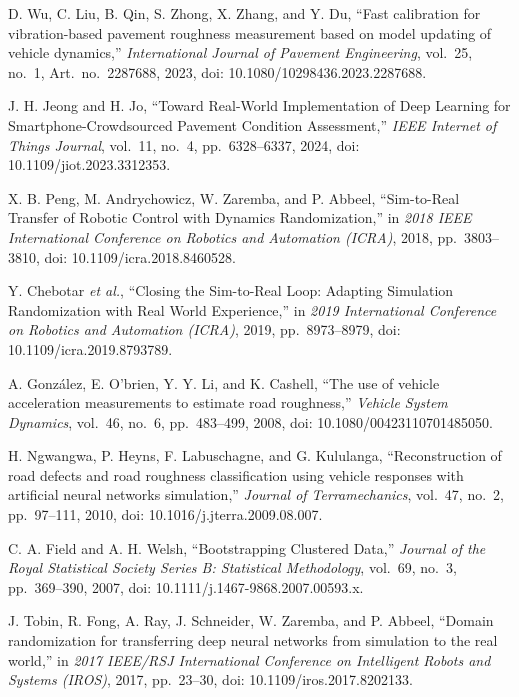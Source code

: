 D. Wu, C. Liu, B. Qin, S. Zhong, X. Zhang, and Y. Du, ``Fast calibration for vibration-based pavement roughness measurement based on model updating of vehicle dynamics,'' \emph{International Journal of Pavement Engineering}, vol.~25, no.~1, Art.~no.~2287688, 2023, doi: 10.1080/10298436.2023.2287688.

J. H. Jeong and H. Jo, ``Toward Real-World Implementation of Deep Learning for Smartphone-Crowdsourced Pavement Condition Assessment,'' \emph{IEEE Internet of Things Journal}, vol.~11, no.~4, pp.~6328--6337, 2024, doi: 10.1109/jiot.2023.3312353.

X. B. Peng, M. Andrychowicz, W. Zaremba, and P. Abbeel, ``Sim-to-Real Transfer of Robotic Control with Dynamics Randomization,'' in \emph{2018 IEEE International Conference on Robotics and Automation (ICRA)}, 2018, pp.~3803--3810, doi: 10.1109/icra.2018.8460528.

Y. Chebotar \emph{et al.}, ``Closing the Sim-to-Real Loop: Adapting Simulation Randomization with Real World Experience,'' in \emph{2019 International Conference on Robotics and Automation (ICRA)}, 2019, pp.~8973--8979, doi: 10.1109/icra.2019.8793789.

A. González, E. O'brien, Y. Y. Li, and K. Cashell, ``The use of vehicle acceleration measurements to estimate road roughness,'' \emph{Vehicle System Dynamics}, vol.~46, no.~6, pp.~483--499, 2008, doi: 10.1080/00423110701485050.

H. Ngwangwa, P. Heyns, F. Labuschagne, and G. Kululanga, ``Reconstruction of road defects and road roughness classification using vehicle responses with artificial neural networks simulation,'' \emph{Journal of Terramechanics}, vol.~47, no.~2, pp.~97--111, 2010, doi: 10.1016/j.jterra.2009.08.007.

C. A. Field and A. H. Welsh, ``Bootstrapping Clustered Data,'' \emph{Journal of the Royal Statistical Society Series B: Statistical Methodology}, vol.~69, no.~3, pp.~369--390, 2007, doi: 10.1111/j.1467-9868.2007.00593.x.

J. Tobin, R. Fong, A. Ray, J. Schneider, W. Zaremba, and P. Abbeel, ``Domain randomization for transferring deep neural networks from simulation to the real world,'' in \emph{2017 IEEE/RSJ International Conference on Intelligent Robots and Systems (IROS)}, 2017, pp.~23--30, doi: 10.1109/iros.2017.8202133.

